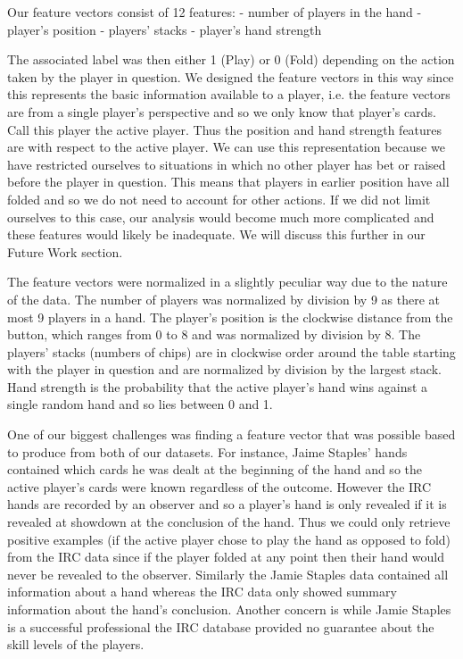 \documentclass[twoside]{article}
\begin{document}
\begin{multicols}{2}
Our feature vectors consist of 12 features: \newline
\indent - number of players in the hand\newline
\indent - player's position \newline
\indent - players' stacks \newline
\indent - player's hand strength \newline

The associated label was then either 1 (Play) or 0 (Fold) depending on the action taken by the player in question. We designed the feature vectors in this way since this represents the basic information available to a player, i.e. the feature vectors are from a single player's perspective and so we only know that player's cards. Call this player the active player. Thus the position and hand strength features are with respect to the active player. We can use this representation because we have restricted ourselves to situations in which no other player has bet or raised before the player in question. This means that players in earlier position have all folded and so we do not need to account for other actions. If we did not limit ourselves to this case, our analysis would become much more complicated and these features would likely be inadequate. We will discuss this further in our Future Work section.

The feature vectors were normalized in a slightly peculiar way due to the nature of the data. The number of players was normalized by division by 9 as there at most 9 players in a hand. The player's position is the clockwise distance from the button, which ranges from 0 to 8 and was normalized by division by 8. The players' stacks (numbers of chips) are in clockwise order around the table starting with the player in question and are normalized by division by the largest stack. Hand strength is the probability that the active player's hand wins against a single random hand and so lies between 0 and 1.

One of our biggest challenges was finding a feature vector that was possible based to produce from both of our datasets. For instance, Jaime Staples' hands contained which cards he was dealt at the beginning of the hand and so the active player's cards were known regardless of the outcome. However the IRC hands are recorded by an observer and so a player's hand is only revealed if it is revealed at showdown at the conclusion of the hand. Thus we could only retrieve positive examples (if the active player chose to play the hand as opposed to fold) from the IRC data since if the player folded at any point then their hand would never be revealed to the observer. Similarly the Jamie Staples data contained all information about a hand whereas the IRC data only showed summary information about the hand's conclusion. Another concern is while Jamie Staples is a successful professional \cite{JaimeStaples} the IRC database provided no guarantee about the skill levels of the players.


\end{multicols}
\end{document}
